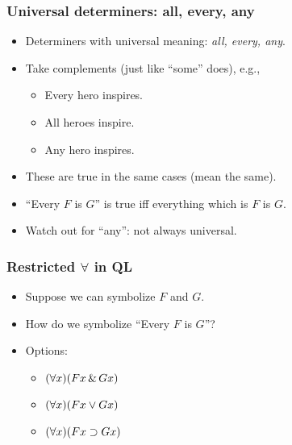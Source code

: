\begin{frame}
\frametitle{Universal determiners: all, every, any}

\begin{itemize}[<+->]
  \item Determiners with universal meaning: \emph{all, every, any}.
  \item Take complements (just like ``some'' does), e.g.,
      \begin{itemize}[<+->]
        \item \alert{Every hero} inspires.
        \item \alert{All heroes} inspire.
        \item \alert{Any hero} inspires.
      \end{itemize}
  \item These are true in the same cases (mean the same).
  \item ``Every $F$ is $G$'' is true iff everything \alert{which is
  $F$} is $G$.
  \item Watch out for ``any'': not always universal.
\end{itemize}
\end{frame}

\begin{frame}
\frametitle{Restricted $\forall$ in QL}

  \begin{itemize}[<+->]
    \item Suppose we can symbolize $F$ and $G$.
    \item How do we symbolize ``Every $F$ is $G$''?
    \item Options:
      \begin{itemize}[<+->]
        \item \alert{$(\forall x)(Fx \,\&\, Gx)$}
        \\
        \item \alert{$(\forall x)(Fx \vee Gx)$}
        \\ 
        \item \alert{$(\forall x)(Fx \supset Gx)$}
        \\ 
      \end{itemize}
  \end{itemize}
\end{frame}

